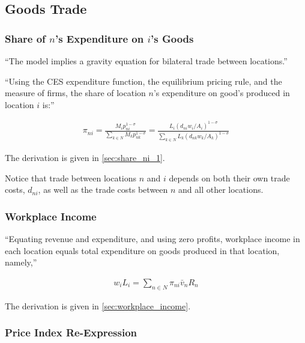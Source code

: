 \documentclass[10pt]{article}
\begin{document}
\subsection{Goods Trade}

\subsubsection{Share of $n$'s Expenditure on $i$'s Goods}

``The model implies a gravity equation 
for bilateral trade between locations.''

``Using the CES expenditure function, the 
equilibrium pricing rule, and the measure 
of firms, the 
share of location $n$'s expenditure on 
good's produced in location $i$ is:''

\begin{align}
    \pi_{n i}=\frac{M_i p_{n i}^{1-\sigma}}{\sum_{k \in N} M_k p_{n k}^{1-\sigma}}=\frac{L_i\left(d_{n i} w_i / A_i\right)^{1-\sigma}}{\sum_{k \in N} L_k\left(d_{n k} w_k / A_k\right)^{1-\sigma}} \label{eq:share_ni_1}
\end{align}

The derivation is given in \autoref{sec:share_ni_1}.

Notice that trade between locations $n$ and $i$
depends on both their own trade costs, $d_{n i}$,
as well as the trade costs between $n$ and all other locations.

\subsubsection{Workplace Income}

``Equating revenue and
expenditure, and using zero profits, workplace income in 
each location equals total expenditure 
on goods produced in that location, namely,''

\begin{align}
    w_i L_i=\sum_{n \in N} \pi_{n i} \bar{v}_n R_n \label{eq:workplace_income}
\end{align}

The derivation is given in \autoref{sec:workplace_income}.

\subsubsection{Price Index Re-Expression}
\end{document}
